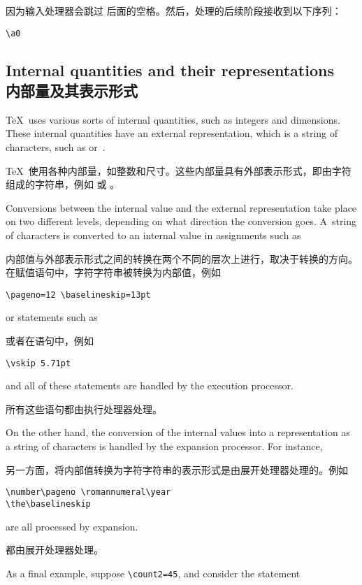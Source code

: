 因为输入处理器会跳过  后面的空格。然后，处理的后续阶段接收到以下序列：
\begin{verbatim}
\a0
\end{verbatim}



\subsection{Internal quantities and their representations\\内部量及其表示形式}

\TeX\ uses various sorts of internal quantities,
such as integers and dimensions. These internal
quantities have an external representation,
which is a string of characters, such as 
 or~\n{91.44cm}.

\TeX\ 使用各种内部量，如整数和尺寸。这些内部量具有外部表示形式，即由字符组成的字符串，例如  或 \n{91.44cm}。

Conversions between the internal value and the external
representation take place on two different levels,
depending on what direction the conversion goes.
A~string of characters is converted to an internal
value in assignments such as

内部值与外部表示形式之间的转换在两个不同的层次上进行，取决于转换的方向。
在赋值语句中，字符字符串被转换为内部值，例如
\begin{verbatim}
\pageno=12 \baselineskip=13pt
\end{verbatim}
or statements such as

或者在语句中，例如
\begin{verbatim}
\vskip 5.71pt
\end{verbatim}
and all of these statements are handled by the execution
processor.

所有这些语句都由执行处理器处理。

On the other hand, the conversion of the internal
values into a representation as a string of
characters is handled by the expansion processor.
For instance, 

另一方面，将内部值转换为字符字符串的表示形式是由展开处理器处理的。例如
\begin{verbatim}
\number\pageno \romannumeral\year
\the\baselineskip
\end{verbatim}
are all processed by expansion.

都由展开处理器处理。

As a final example, suppose \verb>\count2=45>, and
consider the statement

